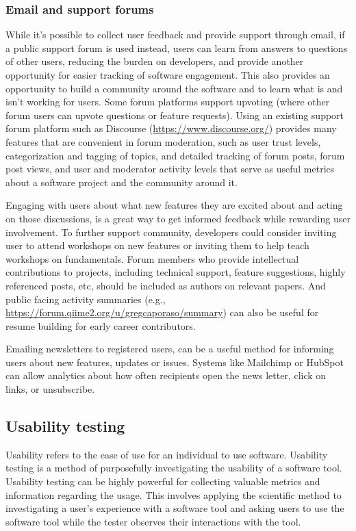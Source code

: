 \documentclass{article}
\begin{document}
\subsubsection{Email and support forums}
While it’s possible to collect user feedback and provide support through email,  if a public support forum is used instead, users can learn from answers to questions of other users, reducing the burden on developers, and provide another opportunity for easier tracking of software engagement. This also provides an opportunity to build a community around the software and to learn what is and isn’t working for users. Some forum platforms support upvoting (where other forum users can upvote questions or feature requests). Using an existing support forum platform such as Discourse (\url{https://www.discourse.org/}) provides many features that are convenient in forum moderation, such as user trust levels, categorization and tagging of topics, and detailed tracking of forum posts, forum post views, and user and moderator activity levels that serve as useful metrics about a software project and the community around it.

Engaging with users about what new features they are excited about and acting on those discussions, is a great way to get informed feedback while rewarding user involvement. To further support community, developers could consider inviting user to attend workshops on new features or inviting them to help teach workshops on fundamentals.  Forum members who provide intellectual contributions to projects, including technical support, feature suggestions, highly referenced posts, etc, should be included as authors on relevant papers. And public facing activity summaries (e.g., \url{https://forum.qiime2.org/u/gregcaporaso/summary}) can also be useful for resume building for early career contributors.

Emailing newsletters to registered users, can be a useful method for informing users about new features, updates or issues. Systems like Mailchimp \cite{mailchimp} or HubSpot \cite{hubspot} can allow analytics about how often recipients open the news letter, click on links, or unsubscribe.

\subsection{Usability testing}

Usability refers to the ease of use for an individual to use software. Usability testing is a method of purposefully investigating the usability of a software tool. Usability testing can be highly powerful for collecting valuable metrics and information regarding the usage. This involves applying the scientific method to investigating a user's experience with a software tool and asking users to use the software tool while the tester observes their interactions with the tool. 
\end{document}
